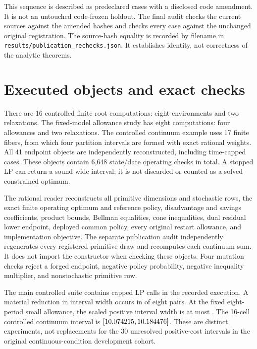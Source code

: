 This sequence is described as predeclared cases with a disclosed code amendment. It is not an untouched code-frozen holdout. The final audit checks the current sources against the amended hashes and checks every case against the unchanged original registration. The source-hash equality is recorded by filename in \texttt{results/publication\_rechecks.json}. It establishes identity, not correctness of the analytic theorems.

\section{Executed objects and exact checks}
There are 16 controlled finite root computations: eight environments and two relaxations. The fixed-model allowance study has eight computations: four allowances and two relaxations. The controlled continuum example uses 17 finite fibers, from which four partition intervals are formed with exact rational weights. All 41 endpoint objects are independently reconstructed, including time-capped cases. These objects contain 6,648 state/date operating checks in total. A stopped LP can return a sound wide interval; it is not discarded or counted as a solved constrained optimum.

The rational reader reconstructs all primitive dimensions and stochastic rows, the exact finite operating optimum and reference policy, disadvantage and savings coefficients, product bounds, Bellman equalities, cone inequalities, dual residual lower endpoint, deployed common policy, every original restart allowance, and implementation objective. The separate publication audit independently regenerates every registered primitive draw and recomputes each continuum sum. It does not import the constructor when checking these objects. Four mutation checks reject a forged endpoint, negative policy probability, negative inequality multiplier, and nonstochastic primitive row.

The main controlled suite contains \RControlledCaps{} capped LP calls in the recorded execution. A material reduction in interval width occurs in \RControlledImproved{} of eight pairs. At the fixed eight-period small allowance, the scaled positive interval width is at most \RScaleGap{}. The 16-cell controlled continuum interval is $[10.074215,10.184476]$. These are distinct experiments, not replacements for the 30 unresolved positive-cost intervals in the original continuous-condition development cohort.

